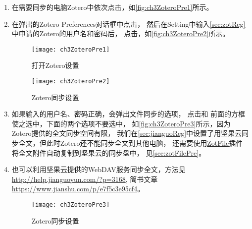 \documentclass[cn,11pt,chinese]{elegantbook}
\begin{document}
		\begin{enumerate}
			\item 
			在需要同步的电脑Zotero中依次点击，如\autoref{fig:ch3ZoteroPre1}所示。
			\item
			在弹出的Zotero Preferences对话框中点击，
			然后在Setting中输入\cref{sec:zotReg}中申请的Zotero的用户名和密码后，
			点击，如\autoref{fig:ch3ZoteroPre2}所示。
				\begin{figure}[t]
					\centering
					\begin{minipage}[t]{\dimexpr0.5\textwidth-4em}
						\centering
						\texttt{[image: ch3ZoteroPre1]}
						\caption{打开Zotero设置}
						\label{fig:ch3ZoteroPre1}
				\end{minipage}
				\begin{minipage}[t]{\dimexpr0.5\textwidth-4em}
					\centering
					\texttt{[image: ch3ZoteroPre2]}
					\caption{Zotero同步设置}
					\label{fig:ch3ZoteroPre2}
				\end{minipage}
			\end{figure}
			\item
			如果输入的用户名、密码正确，会弹出文件同步的选项，
			点击和
			前面的方框使之选中，下面的两个选项不要选中，
			如\autoref{fig:ch3ZoteroPre3}所示，因为Zotero提供的全文同步空间有限，
			我们在\cref{sec:jianguoReg}中设置了用坚果云同步全文，但此时Zotero还不能同步全文到其他电脑，
			还需要使用\href{http://zotfile.com/}{ZotFile}插件将全文附件自动复制到坚果云的同步盘中，
			见\cref{sec:zotFilePre}。
			\item				  	
			也可以利用坚果云提供的WebDAV服务同步全文，方法见\url{http://help.jianguoyun.com/?p=3168},
			简书文章\url{https://www.jianshu.com/p/e7f5c3e95cf4}。			  
			\begin{figure}[htbp]
				\centering
				\texttt{[image: ch3ZoteroPre3]}
				\caption{Zotero同步设置}
				\label{fig:ch3ZoteroPre3}
			\end{figure}
		\end{enumerate}
		
		
		
\end{document}
